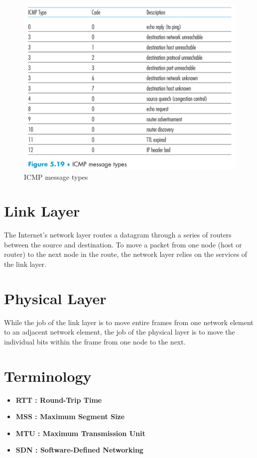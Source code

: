 \documentclass[11pt]{article}
\begin{document}
\begin{figure}[h]
	\centering
	\includegraphics[width=0.8\linewidth]{images/ICMP.png}
	\caption{ICMP message types}
	\label{fig:ICMP}
\end{figure}









\newpage

\section{Link Layer}

The Internet’s network layer routes a datagram through a series of routers between the source and destination. To move a packet from one node (host or router) to the next node in the route, the network layer relies on the services of the link layer.

\section{Physical Layer}

While the job of the link layer is to move entire frames from one network element to an adjacent network element, the job of the physical layer is to move the individual bits within the frame from one node to the next.



\section{Terminology}

\begin{itemize}

	\item \textbf{RTT : Round-Trip Time}
	
	\item \textbf{MSS : Maximum Segment Size}
	
	\item \textbf{MTU : Maximum Transmission Unit}
	
	\item \textbf{SDN : Software-Defined Networking}

\end{itemize}
\end{document}
